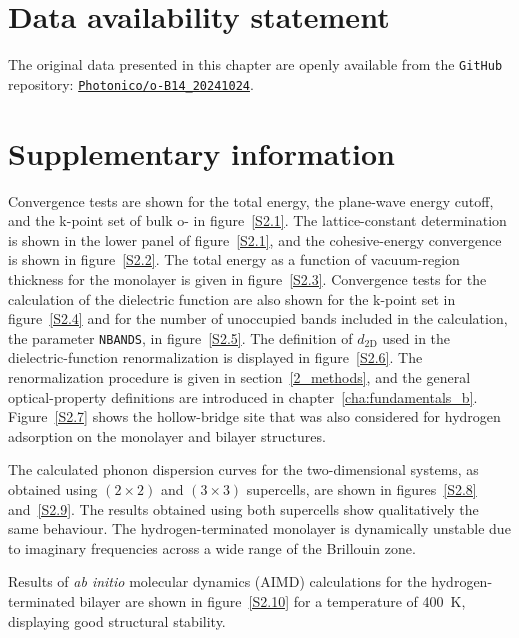 \clearpage
\section{Data availability statement}

The original data presented in this chapter are openly available from the \texttt{GitHub} repository:
\href{https://github.com/Photonico/o-B14_20241024}{\texttt{Photonico/o-B14\_20241024}}.

\section{Supplementary information}
\label{2_supplementary}

Convergence tests are shown for the total energy, the plane-wave energy cutoff,
and the k-point set of bulk o- in figure~\ref{S2.1}.
The lattice-constant determination is shown in the lower panel of figure~\ref{S2.1},
and the cohesive-energy convergence is shown in figure~\ref{S2.2}.
The total energy as a function of vacuum-region thickness for the monolayer is given in figure~\ref{S2.3}.
Convergence tests for the calculation of the dielectric function are also shown for the k-point set in figure~\ref{S2.4}
and for the number of unoccupied bands included in the calculation, the parameter \texttt{NBANDS}, in figure~\ref{S2.5}.
The definition of $d_{\mathrm{2D}}$ used in the dielectric-function renormalization is displayed in figure~\ref{S2.6}.
The renormalization procedure is given in section~\ref{2_methods},
and the general optical-property definitions are introduced in chapter~\ref{cha:fundamentals_b}.
Figure~\ref{S2.7} shows the hollow-bridge site that was also considered for hydrogen adsorption on the monolayer and bilayer structures.

The calculated phonon dispersion curves for the two-dimensional systems,
as obtained using $(2 \times 2)$ and $(3 \times 3)$ supercells, are shown in figures~\ref{S2.8} and~\ref{S2.9}.
The results obtained using both supercells show qualitatively the same behaviour.
The hydrogen-terminated monolayer is dynamically unstable due to imaginary frequencies across a wide range of the Brillouin zone.

Results of \textit{ab initio} molecular dynamics (AIMD) calculations for the hydrogen-terminated bilayer are shown in figure~\ref{S2.10} for a temperature of \qty{400}{K}, displaying good structural stability.

